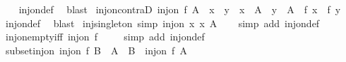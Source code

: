 \begin{isabellebody}
%
\isadelimproof
\ \ %
\endisadelimproof
%
\isatagproof
{}\isamarkupfalse%
\ inj{\isacharunderscore}{\kern0pt}on{\isacharunderscore}{\kern0pt}def\ \isamarkupfalse%
\ blast%
\endisatagproof
{\isafoldproof}%
%
\isadelimproof
\isanewline
%
\endisadelimproof
\isanewline
{}\isamarkupfalse%
\ inj{\isacharunderscore}{\kern0pt}on{\isacharunderscore}{\kern0pt}contraD{\isacharcolon}{\kern0pt}\ {\isachardoublequoteopen}inj{\isacharunderscore}{\kern0pt}on\ f\ A\ {\isasymLongrightarrow}\ x\ {\isasymnoteq}\ y\ {\isasymLongrightarrow}\ x\ {\isasymin}\ A\ {\isasymLongrightarrow}\ y\ {\isasymin}\ A\ {\isasymLongrightarrow}\ f\ x\ {\isasymnoteq}\ f\ y{\isachardoublequoteclose}\isanewline
%
\isadelimproof
\ \ %
\endisadelimproof
%
\isatagproof
{}\isamarkupfalse%
\ inj{\isacharunderscore}{\kern0pt}on{\isacharunderscore}{\kern0pt}def\ \isamarkupfalse%
\ blast%
\endisatagproof
{\isafoldproof}%
%
\isadelimproof
\isanewline
%
\endisadelimproof
\isanewline
{}\isamarkupfalse%
\ inj{\isacharunderscore}{\kern0pt}singleton\ {\isacharbrackleft}{\kern0pt}simp{\isacharbrackright}{\kern0pt}{\isacharcolon}{\kern0pt}\ {\isachardoublequoteopen}inj{\isacharunderscore}{\kern0pt}on\ {\isacharparenleft}{\kern0pt}{\isasymlambda}x{\isachardot}{\kern0pt}\ {\isacharbraceleft}{\kern0pt}x{\isacharbraceright}{\kern0pt}{\isacharparenright}{\kern0pt}\ A{\isachardoublequoteclose}\isanewline
%
\isadelimproof
\ \ %
\endisadelimproof
%
\isatagproof
{}\isamarkupfalse%
\ {\isacharparenleft}{\kern0pt}simp\ add{\isacharcolon}{\kern0pt}\ inj{\isacharunderscore}{\kern0pt}on{\isacharunderscore}{\kern0pt}def{\isacharparenright}{\kern0pt}%
\endisatagproof
{\isafoldproof}%
%
\isadelimproof
\isanewline
%
\endisadelimproof
\isanewline
{}\isamarkupfalse%
\ inj{\isacharunderscore}{\kern0pt}on{\isacharunderscore}{\kern0pt}empty{\isacharbrackleft}{\kern0pt}iff{\isacharbrackright}{\kern0pt}{\isacharcolon}{\kern0pt}\ {\isachardoublequoteopen}inj{\isacharunderscore}{\kern0pt}on\ f\ {\isacharbraceleft}{\kern0pt}{\isacharbraceright}{\kern0pt}{\isachardoublequoteclose}\isanewline
%
\isadelimproof
\ \ %
\endisadelimproof
%
\isatagproof
{}\isamarkupfalse%
\ {\isacharparenleft}{\kern0pt}simp\ add{\isacharcolon}{\kern0pt}\ inj{\isacharunderscore}{\kern0pt}on{\isacharunderscore}{\kern0pt}def{\isacharparenright}{\kern0pt}%
\endisatagproof
{\isafoldproof}%
%
\isadelimproof
\isanewline
%
\endisadelimproof
\isanewline
{}\isamarkupfalse%
\ subset{\isacharunderscore}{\kern0pt}inj{\isacharunderscore}{\kern0pt}on{\isacharcolon}{\kern0pt}\ {\isachardoublequoteopen}inj{\isacharunderscore}{\kern0pt}on\ f\ B\ {\isasymLongrightarrow}\ A\ {\isasymsubseteq}\ B\ {\isasymLongrightarrow}\ inj{\isacharunderscore}{\kern0pt}on\ f\ A{\isachardoublequoteclose}\isanewline

\end{isabellebody}
